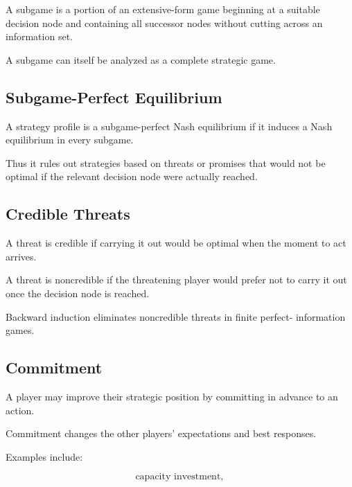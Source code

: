 A subgame is a portion of an extensive-form game beginning at a suitable
decision node and containing all successor nodes without cutting across an
information set.

A subgame can itself be analyzed as a complete strategic game.

\subsection{Subgame-Perfect Equilibrium}
\label{subsec:subgame-perfect-equilibrium}

A strategy profile is a subgame-perfect Nash equilibrium if it induces a
Nash equilibrium in every subgame.

Thus it rules out strategies based on threats or promises that would not be
optimal if the relevant decision node were actually reached.

\subsection{Credible Threats}
\label{subsec:credible-threats}

A threat is credible if carrying it out would be optimal when the moment
to act arrives.

A threat is noncredible if the threatening player would prefer not to
carry it out once the decision node is reached.

Backward induction eliminates noncredible threats in finite perfect-
information games.

\subsection{Commitment}
\label{subsec:game-theory-commitment}

A player may improve their strategic position by committing in advance to
an action.

Commitment changes the other players' expectations and best responses.

Examples include:

\[
\boxed{
\text{capacity investment},
}
\]

